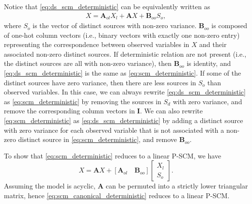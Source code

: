 \documentclass[12pt]{article}
\newcommand{\bA}{\mathbf{A}}
\newcommand{\bB}{\mathbf{B}}
\newcommand{\bI}{\mathbf{I}}
\begin{document}
Notice that \eqref{eq:ds_scm_deterministic} can be equivalently written as
\begin{align}
X =\bA_{ol}X_{l} + \bA X + \bB_{oo}S_o,
\label{eq:scm_deterministic}
\end{align}
where $S_o$ is the vector of distinct sources with non-zero variance. $\bB_{oo}$ is composed of one-hot column vectors (i.e., binary vectors with exactly one non-zero entry) representing the correspondence between observed variables in $X$ and their associated non-zero distinct sources. If deterministic relation are not present (i.e., the distinct sources are all with non-zero variance), then $\bB_{oo}$ is identity, and \eqref{eq:ds_scm_deterministic} is the same as \eqref{eq:scm_deterministic}. If some of the distinct sources have zero variance, then there are less sources in $S_o$ than observed variables. In this case, we can always rewrite \eqref{eq:ds_scm_deterministic} as \eqref{eq:scm_deterministic} by removing the sources in $S_d$ with zero variance, and remove the corresponding column vectors in $\bI$. We can also rewrite \eqref{eq:scm_deterministic} as \eqref{eq:ds_scm_deterministic} by adding a distinct source with zero variance for each observed variable that is not associated with a non-zero distinct source in \eqref{eq:scm_deterministic}, and remove $\bB_{oo}$.


To show that \eqref{eq:scm_deterministic} reduces to a linear P-SCM, we have
\begin{equation}
X = \bA X + [\bA_{ol} \quad \bB_{oo}] 
\begin{bmatrix}
X_{l} \\
S_{o}
\end{bmatrix}.
\label{eq:scm_canonical_deterministic}
\end{equation}
Assuming the model is acyclic, $\bA$ can be permuted into a strictly lower triangular matrix, hence \eqref{eq:scm_canonical_deterministic} reduces to a linear P-SCM. %
\end{document}

